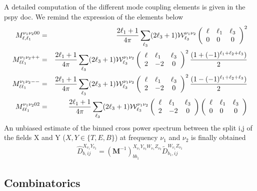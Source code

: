 \documentclass[a4paper, 11pt]{article}
\def\ba{\begin{eqnarray}}
\def\ea{\end{eqnarray}}
\begin{document}
A detailed computation of the different mode coupling elements is given in the pspy doc. We remind the expression of the elements below
\ba
M^{\nu_{1}\nu_{2}00}_{ \ell, \ell_1} &=&   \frac{2\ell_1 +1}{4\pi}  \sum_{ \ell_3} (2\ell_3+1) {\cal W}^{\nu_{1}\nu_{2}}_{\ell_3} 
\left(\begin{array}{clcr}
\ell & \ell_1 & \ell_3\\
0 & 0 & 0 \end{array}\right)^{2} \nonumber \\
M^{\nu_{1}\nu_{2}++}_{\ell \ell_{1}} &=& \frac{2\ell_1 +1}{4\pi}  \sum_{\ell_{3}} (2\ell_3 +1) {\cal W}^{\nu_{1}\nu_{2}}_{\ell_3} \left(\begin{array}{clcr}
\ell & \ell_1 & \ell_3\\
2 & -2 & 0 \end{array}\right)^{2} \frac{(1+ (-1)^{\ell_1+ \ell_2 + \ell_3})}{2} \nonumber \\
M^{\nu_{1}\nu_{2}--}_{\ell \ell_{1}} &=& \frac{2\ell_1 +1}{4\pi}  \sum_{\ell_{3}} (2\ell_3 +1) {\cal W}^{\nu_{1}\nu_{2}}_{\ell_3} \left(\begin{array}{clcr}
\ell & \ell_1 & \ell_3\\
2 & -2 & 0 \end{array}\right)^{2} \frac{(1- (-1)^{\ell_1+ \ell_2 + \ell_3})}{2} \nonumber \\
M^{\nu_{1}\nu_{2}02}_{\ell \ell_{1}} &=& \frac{2\ell_1 +1}{4\pi}  \sum_{\ell_{3}} (2\ell_3 +1) {\cal W}^{\nu_{1}\nu_{2}}_{\ell_3} \left(\begin{array}{clcr}
\ell & \ell_1 & \ell_3\\
2 & -2 & 0 \end{array}\right) 
\left(\begin{array}{clcr}
\ell & \ell_1 & \ell_3\\
0 & 0 & 0 \end{array}\right)
\ea
An unbiased estimate of the binned cross power spectrum between the split i,j of the fields X and Y ($X, Y \in \{T,E,B \}$) at frequency $\nu_{1}$ and $\nu_{2}$ is finally obtained
\ba
\hat{D}_{b, ij}^{X_{\nu_{1}}Y_{\nu_{2}}}= (\bm{M}^{-1})^{X_{\nu_{1}}Y_{\nu_{2}}W_{\nu_{1}}Z_{\nu_{2}}}_{bb_{1}} \tilde{D}_{b_{1}, ij}^{W_{\nu_{1}}Z_{\nu_{2}}}
\ea

\subsection{Combinatorics}
\end{document}
